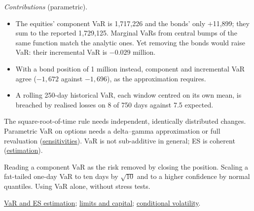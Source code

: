 \begin{qfmethod}
\emph{Contributions} (parametric).
\begin{itemize}
\item The equities' component VaR is 1{,}717{,}226 and the bonds' only $+$11{,}899; they sum to the reported 1{,}729{,}125. Marginal VaRs from central bumps of the same function match the analytic ones. Yet removing the bonds would raise VaR: their incremental VaR is $-0.029$ million.
\item With a bond position of 1 million instead, component and incremental VaR agree ($-1{,}672$ against $-1{,}696$), as the approximation requires.
\item A rolling 250-day historical VaR, each window centred on its own mean, is breached by realised losses on 8 of 750 days against 7.5 expected.
\end{itemize}

 The square-root-of-time rule needs independent, identically distributed changes. Parametric VaR on options needs a delta--gamma approximation or full revaluation (\hyperref[meth:sensitivity-scenario-risk-measures]{sensitivities}). VaR is not sub-additive in general; ES is coherent (\hyperref[meth:var-es-estimation-methods]{estimation}).

 Reading a component VaR as the risk removed by closing the position. Scaling a fat-tailed one-day VaR to ten days by $\sqrt{10}$ and to a higher confidence by normal quantiles. Using VaR alone, without stress tests.

 \hyperref[meth:var-es-estimation-methods]{VaR and ES estimation}; \hyperref[meth:market-risk-limits-capital]{limits and capital}; \hyperref[mod:garch-volatility-forecast]{conditional volatility}.

\end{qfmethod}

